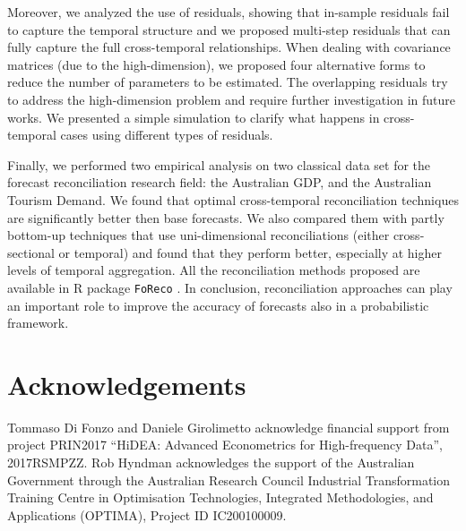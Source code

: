 \documentclass[a4paper,11pt]{article}
\theoremstyle{definition}
\begin{document}
Moreover, we analyzed the use of residuals, showing that in-sample residuals fail to capture the temporal structure and we proposed multi-step residuals that can fully capture the full cross-temporal relationships. When dealing with covariance matrices (due to the high-dimension), we proposed four alternative forms to reduce the number of parameters to be estimated. The overlapping residuals try to address the high-dimension problem and require further investigation in future works. We presented a simple simulation to clarify what happens in cross-temporal cases using different types of residuals.%

Finally, we performed two empirical analysis on two classical data set for the forecast reconciliation research field: the Australian GDP, and the Australian Tourism Demand. We found that optimal cross-temporal reconciliation techniques are significantly better then base forecasts. We also compared them with partly bottom-up techniques that use uni-dimensional reconciliations (either cross-sectional or temporal) and found that they perform better, especially at higher levels of temporal aggregation. All the reconciliation methods proposed are available in \textsf{R} package \texttt{FoReco} \citep{girolimetto2022}. In conclusion, reconciliation approaches can play an important role to improve the accuracy of forecasts also in a probabilistic framework.

\section*{Acknowledgements}

\noindent Tommaso Di Fonzo and Daniele Girolimetto acknowledge financial support from project PRIN2017 “HiDEA: Advanced Econometrics for High-frequency Data”, 2017RSMPZZ. Rob Hyndman acknowledges the support of the Australian Government through the Australian Research Council Industrial Transformation Training Centre in Optimisation Technologies, Integrated Methodologies, and Applications (OPTIMA), Project ID IC200100009.





\clearpage

\appendix
\setcounter{table}{0}
\renewcommand{\thetable}{\Alph{section}.\arabic{table}}
%
\end{document}
